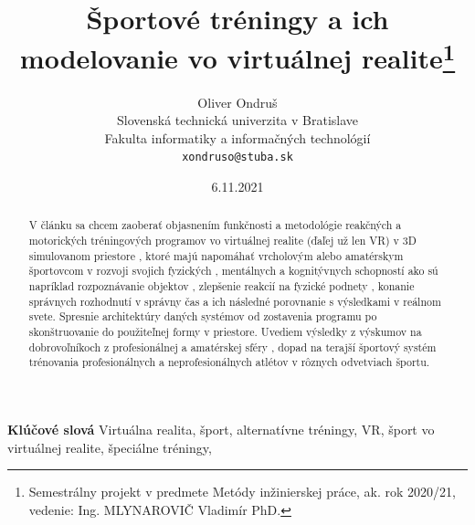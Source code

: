 \documentclass[10pt,twoside,slovak,a4paper]{article}										%
\title{Športové tréningy a ich modelovanie vo virtuálnej realite\thanks{Semestrálny projekt v predmete Metódy inžinierskej práce, ak. rok 2020/21, vedenie: Ing. MLYNAROVIČ Vladimír  PhD.}}
\author{Oliver Ondruš\\[2pt]
	{\small Slovenská technická univerzita v Bratislave}\\
	{\small Fakulta informatiky a informačných technológií}\\
	{\small \texttt{xondruso@stuba.sk}}
	}
\date{\small 6.11.2021}
\begin{document}
\maketitle

\begin{abstract}
V článku sa chcem zaoberať objasnením funkčnosti a metodológie reakčných a motorických tréningových programov vo virtuálnej realite (ďaľej už len VR) v 3D simulovanom priestore , ktoré majú napomáhať vrcholovým alebo amatérskym športovcom v rozvoji svojich fyzických , mentálnych a kognitývnych schopností ako sú napríklad rozpoznávanie objektov , zlepšenie reakcií na fyzické podnety , konanie správnych rozhodnutí v správny čas a ich následné porovnanie s výsledkami v reálnom svete. Spresnie architektúry daných systémov od zostavenia programu po skonštruovanie do použiteľnej formy v priestore. Uvediem výsledky z výskumov na dobrovoľníkoch z profesionálnej a amatérskej sféry , dopad na terajší športový systém trénovania profesionálnych a neprofesionálnych atlétov v rôznych odvetviach športu.
\end{abstract}

\textbf{Klúčové slová}
Virtuálna realita, šport, alternatívne tréningy, VR, šport vo virtuálnej realite, špeciálne tréningy, 

\clearpage
\end{document}
